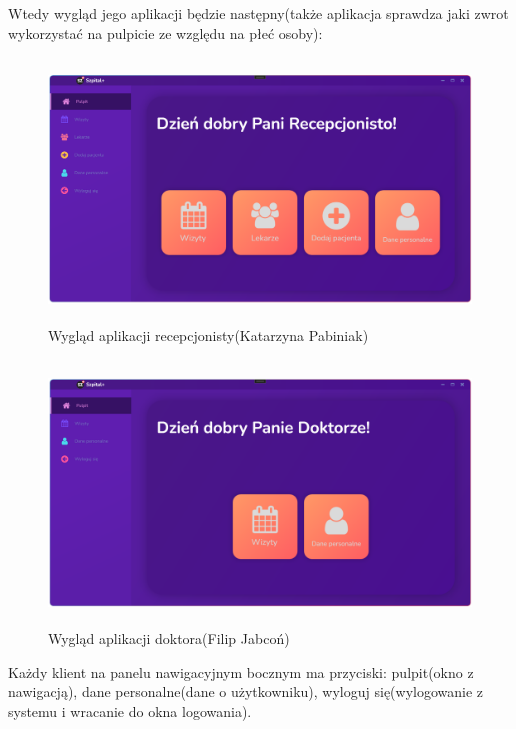 \begin{flushleft}
    Wtedy wygląd jego aplikacji będzie następny(także aplikacja sprawdza jaki zwrot wykorzystać na pulpicie ze względu na płeć osoby):
    \begin{figure}[H]
	\begin{center}
	\includegraphics[height=7cm]{images/recep_view.png}
        \caption{Wygląd aplikacji recepcjonisty(Katarzyna Pabiniak)}
        \label{fig:recep_view}
	\end{center}
    \end{figure}
    \begin{figure}[H]
        \begin{center}
	\includegraphics[height=7cm]{images/doktor_view.png}
        \caption{Wygląd aplikacji doktora(Filip Jabcoń)}
        \label{fig:doktor_view}
	\end{center}
    \end{figure}
    \hspace{5mm}Każdy klient na panelu nawigacyjnym bocznym ma przyciski: pulpit(okno z nawigacją), dane personalne(dane o użytkowniku), wyloguj się(wylogowanie z systemu i wracanie do okna logowania).

\end{flushleft}
